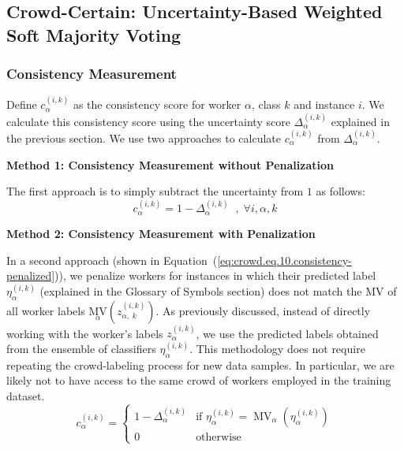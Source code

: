 \documentclass[default]{bst/sn-jnl_mine}%
\newenvironment{mymdframed}[1]{
	\begin{framed}
        \begin{center}
        \textbf{#1} \\
        \end{center}
        }
{\end{framed}}
\begin{document}
\subsection{Crowd-Certain: Uncertainty-Based Weighted Soft Majority Voting}
\subsubsection{Consistency Measurement}
Define $c_{\alpha}^{(i,k)} $ as the consistency score for worker $\alpha $, class $k $ and instance $i $. We calculate this consistency score using the uncertainty score $\Delta_{\alpha}^{(i,k)} $ explained in the previous section. We use two approaches to calculate $c_{\alpha}^{(i,k)} $ from $\Delta_{\alpha}^{(i,k)} $.
\begin{mymdframed}{Method 1: Consistency Measurement without Penalization}
    The first approach is to simply subtract the uncertainty from $1 $ as follows:
    \begin{equation}
        c_{\alpha}^{(i,k)}=1-\Delta_{\alpha}^{(i,k)}\;\;,\;\forall i,\alpha,k
        \label{eq:crowd.Eq.9.consistency}%
    \end{equation}
\end{mymdframed}
\begin{mymdframed}{Method 2: Consistency Measurement with Penalization}
    In a second approach (shown in Equation~(\ref{eq:crowd.eq.10.consistency-penalized})), we penalize workers for instances in which their predicted label $\eta_{\alpha}^{(i,k)} $ (explained in the Glossary of Symbols section) does not match the MV of all worker labels ${{\underset \alpha{\mathrm{MV}}}{\left(z_{\alpha,\;k}^{(i,k)}\right)}} $. As previously discussed, instead of directly working with the worker's labels $z_{\alpha}^{(i,k)} $, we use the predicted labels obtained from the ensemble of classifiers $\eta_{\alpha}^{(i,k)} $. This methodology does not require repeating the crowd-labeling process for new data samples. In particular, we are likely not to have access to the same crowd of workers employed in the training dataset.
    \begin{equation}
        c_{\alpha}^{(i,k)} =
        \begin{cases}
            1 - \Delta_{\alpha}^{(i,k)} & \text{if } \eta_{\alpha}^{(i,k)} = \operatorname{MV}_{\alpha}(\eta_{\alpha}^{(i,k)}) \\
            0 & \text{otherwise}
        \end{cases}
        \label{eq:crowd.eq.10.consistency-penalized}
    \end{equation}
\end{mymdframed}
\end{document}
